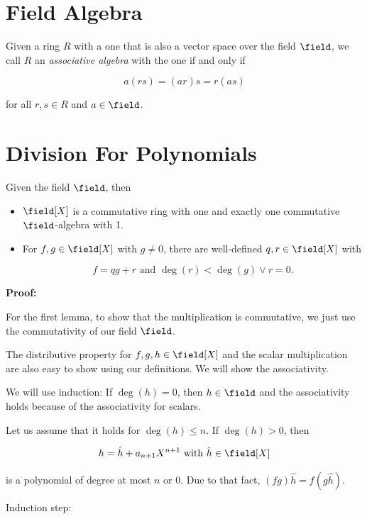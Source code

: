 \section{Field Algebra}

Given a ring \(R\) with a one that is also a vector space over the field \(\field\), we call 
\(R\) an \emph{associative algebra} with the one if and only if 

\[
    a(rs) = (ar)s = r(as)
\]

for all \(r,s \in R\) and \(a \in \field\).

\section{Division For Polynomials}

Given the field \(\field\), then 

\begin{itemize}

    \item  \(\field[X]\) is a commutative ring with one and exactly one commutative \(\field\)-algebra with 1.

    \item For \(f, g \in \field[X]\) with \(g \ne 0\), there are well-defined \(q,r \in \field[X]\) with 
    
    \[
        f = qg + r \text{ and } \deg(r) < \deg(g) \lor r = 0.
    \]
    
\end{itemize}

\textbf{Proof:}

For the first lemma, to show that the multiplication is commutative, we just 
use the commutativity of our field \(\field\). 

The distributive property for \(f,g,h \in \field [X]\) and the scalar multiplication 
are also easy to show using our definitions. We will show the associativity. 

We will use induction: If \(\deg(h) = 0\), then \(h \in \field\) and the associativity holds because of the 
associativity for scalars. 

Let us assume that it holds for \(\deg(h) \le n\). If \(\deg(h) > 0\), then

\[
    h = \hat{h} + a_{n + 1}X^{n + 1} \text{ with } \hat{h} \in \field [X]
\]

is a polynomial of degree at most \(n\) or 0. Due to that fact, \((fg)\hat{h} = f(g\hat{h})\). 

Induction step:

